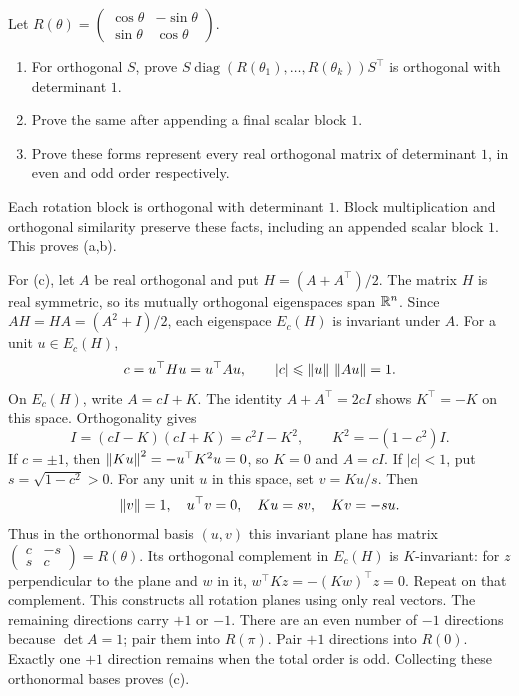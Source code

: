\begin{problem}\label{ex:09:rotation-blocks}
Let \(R(\theta)=\begin{pmatrix}\cos\theta&-\sin\theta\\
\sin\theta&\cos\theta\end{pmatrix}\).
\begin{enumerate}
\item For orthogonal \(S\), prove
\(S\operatorname{diag}(R(\theta_1),\ldots,R(\theta_k))S^\top\)
is orthogonal with determinant \(1\).
\item Prove the same after appending a final scalar block \(1\).
\item Prove these forms represent every real orthogonal matrix of
determinant \(1\), in even and odd order respectively.
\end{enumerate}
\end{problem}
\begin{solution}
Each rotation block is orthogonal with determinant \(1\).
Block multiplication and orthogonal similarity preserve these facts,
including an appended scalar block \(1\). This proves (a,b).

For (c), let \(A\) be real orthogonal and put \(H=(A+A^\top)/2\).
The matrix \(H\) is real symmetric, so its mutually orthogonal
eigenspaces span \(\mathbb R^n\). Since \(AH=HA=(A^2+I)/2\), each eigenspace
\(E_c(H)\) is invariant under \(A\).
For a unit \(u\in E_c(H)\),
\[
 c=u^\top Hu=u^\top Au,\qquad |c|\leqslant\left\lVert u\right\rVert\,\left\lVert Au\right\rVert=1.
\]
On \(E_c(H)\), write \(A=cI+K\). The identity \(A+A^\top=2cI\)
shows \(K^\top=-K\) on this space. Orthogonality gives
\[
 I=(cI-K)(cI+K)=c^2I-K^2,\qquad K^2=-(1-c^2)I.
\]
If \(c=\pm1\), then
\(\left\lVert Ku\right\rVert^2=-u^\top K^2u=0\), so \(K=0\) and \(A=cI\).
If \(|c|<1\), put \(s=\sqrt{1-c^2}>0\).
For any unit \(u\) in this space, set \(v=Ku/s\). Then
\[
 \left\lVert v\right\rVert=1,\quad u^\top v=0,\quad Ku=sv,\quad Kv=-su.
\]
Thus in the orthonormal basis \((u,v)\) this invariant plane has matrix
\(\begin{pmatrix}c&-s\\s&c\end{pmatrix}=R(\theta)\).
Its orthogonal complement in \(E_c(H)\) is \(K\)-invariant:
for \(z\) perpendicular to the plane and \(w\) in it,
\(w^\top Kz=-(Kw)^\top z=0\).
Repeat on that complement. This constructs all rotation planes using
only real vectors.
The remaining directions carry \(+1\) or \(-1\).
There are an even number of \(-1\) directions because \(\det A=1\);
pair them into \(R(\pi)\). Pair \(+1\) directions into \(R(0)\).
Exactly one \(+1\) direction remains when the total order is odd.
Collecting these orthonormal bases proves (c).
\end{solution}

